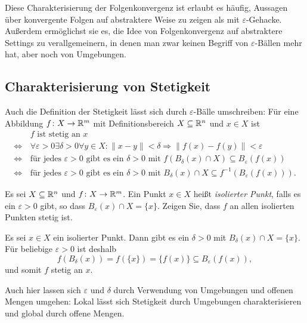 \documentclass[a4paper,10pt]{article}
\begin{document}
\begin{bem}
 Diese Charakterisierung der Folgenkonvergenz ist erlaubt es häufig, Aussagen über konvergente Folgen auf abstraktere Weise zu zeigen als mit $\varepsilon$-Gehacke. Außerdem ermöglichst sie es, die Idee von Folgenkonvergenz auf abstraktere Settings zu verallgemeinern, in denen man zwar keinen Begriff von $\varepsilon$-Bällen mehr hat, aber noch von Umgebungen.
\end{bem}


\subsection{Charakterisierung von Stetigkeit}


Auch die Definition der Stetigkeit lässt sich durch $\varepsilon$-Bälle umschreiben: Für eine Abbildung $f \colon X \to \mathbb{R}^m$ mit Definitionsbereich $X \subseteq \mathbb{R}^n$ und $x \in X$ ist
\begin{align*}
                &\, \text{$f$ ist stetig an $x$} \\
 \Leftrightarrow&\, \forall \varepsilon > 0 \exists \delta > 0 \forall y \in X : \|x-y\| < \delta \Rightarrow \|f(x)-f(y)\| < \varepsilon \\
 \Leftrightarrow&\, \text{für jedes $\varepsilon > 0$ gibt es ein $\delta > 0$ mit $f(B_\delta(x) \cap X) \subseteq B_\varepsilon(f(x))$} \\
 \Leftrightarrow&\, \text{für jedes $\varepsilon > 0$ gibt es ein $\delta > 0$ mit $B_\delta(x) \cap X \subseteq f^{-1}(B_\varepsilon(f(x)))$}.
\end{align*}


\begin{question}
 Es sei $X \subseteq \mathbb{R}^n$ und $f \colon X \to \mathbb{R}^m$. Ein Punkt $x \in X$ heißt \emph{isolierter Punkt}, falls es ein $\varepsilon > 0$ gibt, so dass $B_\varepsilon(x) \cap X = \{x\}$. Zeigen Sie, dass $f$ an allen isolierten Punkten stetig ist.
\end{question}
\begin{solution}
 Es sei $x \in X$ ein isolierter Punkt. Dann gibt es ein $\delta > 0$ mit $B_\delta(x) \cap X = \{x\}$. Für beliebige $\varepsilon > 0$ ist deshalb
 \[
  f(B_\delta(x)) = f(\{x\}) = \{f(x)\} \subseteq B_\varepsilon(f(x)),
 \]
 und somit $f$ stetig an $x$.
\end{solution}


Auch hier lassen sich $\varepsilon$ und $\delta$ durch Verwendung von Umgebungen und offenen Mengen umgehen: Lokal lässt sich Stetigkeit durch Umgebungen charakterisieren und global durch offene Mengen.
\end{document}
